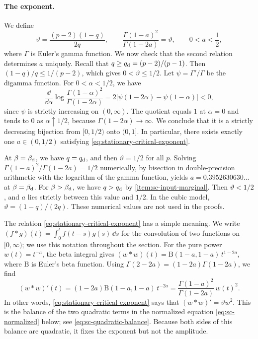 \paragraph{The exponent.} We define
\begin{equation}\label{eq:stationary-critical-exponent}
 \vartheta=\frac{(p-2)(1-q)}{2q},\qquad
 \frac{\Gamma(1-a)^2}{\Gamma(1-2a)}=\vartheta,
 \qquad 0<a<\frac12,
\end{equation}
where $\Gamma$ is Euler's gamma function. We now check that the second relation determines $a$ uniquely. Recall that $q\ge q_{\mathrm d}=(p-2)/(p-1)$. Then $(1-q)/q\le1/(p-2)$, which gives $0<\vartheta\le1/2$. Let $\psi=\Gamma'/\Gamma$ be the digamma function. For $0<\alpha<1/2$, we have
\[
 \frac{\dd}{\dd\alpha}\log\frac{\Gamma(1-\alpha)^2}{\Gamma(1-2\alpha)}
 =2\bigl[\psi(1-2\alpha)-\psi(1-\alpha)\bigr]<0,
\]
since $\psi$ is strictly increasing on $(0,\infty)$. The quotient equals $1$ at $\alpha=0$ and tends to $0$ as $\alpha\uparrow1/2$, because $\Gamma(1-2\alpha)\to\infty$. We conclude that it is a strictly decreasing bijection from $[0,1/2)$ onto $(0,1]$. In particular, there exists exactly one $a\in(0,1/2)$ satisfying \eqref{eq:stationary-critical-exponent}.

At $\beta=\beta_{\mathrm d}$, we have $q=q_{\mathrm d}$, and then $\vartheta=1/2$ for all $p$. Solving $\Gamma(1-a)^2/\Gamma(1-2a)=1/2$ numerically, by bisection in double-precision arithmetic with the logarithm of the gamma function, yields $a=0.3952630630\ldots$ at $\beta=\beta_{\mathrm d}$. For $\beta>\beta_{\mathrm d}$, we have $q>q_{\mathrm d}$ by \ref{item:sc-input-marginal}. Then $\vartheta<1/2$, and $a$ lies strictly between this value and $1/2$. In the cubic model, $\vartheta=(1-q)/(2q)$. These numerical values are not used in the proofs.

The relation \eqref{eq:stationary-critical-exponent} has a simple meaning. We write $(f*g)(t)=\int_0^tf(t-s)g(s)\,\dd s$ for the convolution of two functions on $[0,\infty)$; we use this notation throughout the section. For the pure power $w(t)=t^{-a}$, the beta integral gives $(w*w)(t)=\mathrm B(1-a,1-a)\,t^{1-2a}$, where $\mathrm B$ is Euler's beta function. Using $\Gamma(2-2a)=(1-2a)\Gamma(1-2a)$, we find
\begin{equation}\label{eq:sc-power-balance}
 (w*w)'(t)=(1-2a)\mathrm B(1-a,1-a)\,t^{-2a}
 =\frac{\Gamma(1-a)^2}{\Gamma(1-2a)}\,w(t)^2 .
\end{equation}
In other words, \eqref{eq:stationary-critical-exponent} says that $(w*w)'=\vartheta w^2$. This is the balance of the two quadratic terms in the normalized equation \eqref{eq:sc-normalized} below; see \eqref{eq:sc-quadratic-balance}. Because both sides of this balance are quadratic, it fixes the exponent but not the amplitude.

